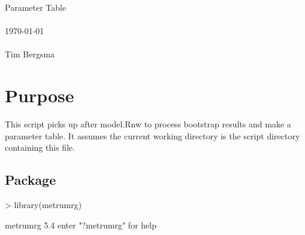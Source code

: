 
\usepackage{Sweave}

 

\vspace*{2cm}
\begin{center}
{\Large Parameter Table}\\
~\\
\today\\
~\\
Tim Bergsma\\
\end{center}
\newpage

\section{Purpose}
This script picks up after model.Rnw to process bootstrap results and make a parameter table. It assumes
the current working directory is the script directory containing this file.
\subsection{Package}
\begin{Schunk}
\begin{Sinput}
> library(metrumrg)
\end{Sinput}
\begin{Soutput}
metrumrg 5.4 
enter "?metrumrg" for help
\end{Soutput}
\end{Schunk}
